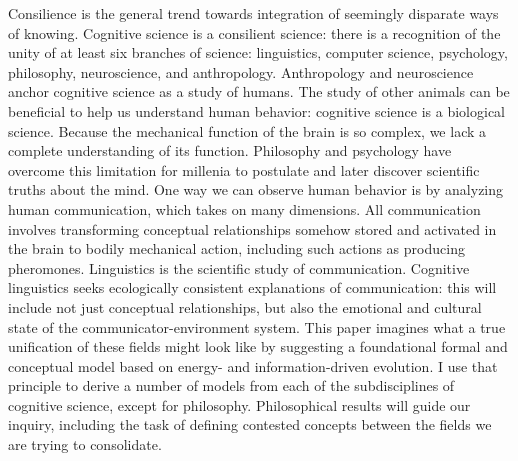 Consilience is the general trend towards integration of seemingly disparate
ways of knowing. Cognitive science is a consilient science: there is a recognition
of the unity of at least six branches of science: linguistics, computer science,
psychology, philosophy, neuroscience, and anthropology. Anthropology and 
neuroscience anchor cognitive science as a study of humans. The study of other
animals can be beneficial to help us understand human behavior:
cognitive science is a biological science. Because the mechanical function of 
the brain is so complex, we lack a complete understanding of its function. 
Philosophy and psychology have overcome this limitation for millenia to 
postulate and later discover scientific truths about the mind. One way we can
observe human behavior is by analyzing human communication, which takes on many
dimensions. All communication involves transforming conceptual relationships
somehow stored and activated in the brain to bodily mechanical action, including
such actions as producing pheromones. Linguistics is the scientific study of
communication. Cognitive linguistics seeks ecologically consistent explanations
of communication: this will include not just conceptual relationships, but also
the emotional and cultural state of the communicator-environment 
system. This paper imagines what a true unification of these fields might look
like by suggesting a foundational formal and conceptual model based on 
energy- and information-driven evolution. I use that principle to derive 
a number of models from each of the subdisciplines of cognitive science,
except for philosophy. Philosophical results will guide our inquiry, including
the task of defining contested concepts between the fields we are trying to
consolidate.
